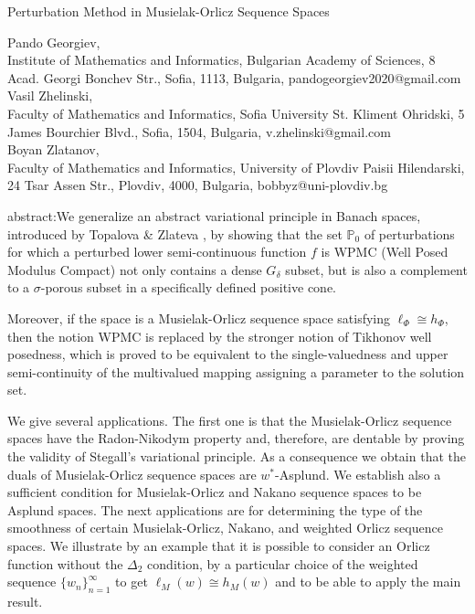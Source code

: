 \documentclass[12pt]{article}
\theoremstyle{thmstyleone}%
\theoremstyle{thmstyletwo}%
\theoremstyle{thmstylethree}%
\begin{document}
\begin{center}
	{\Large Perturbation Method in Musielak-Orlicz Sequence Spaces}
\end{center}

\begin{center}
	{\sc Pando Georgiev},\\ 
	Institute of Mathematics and Informatics, Bulgarian Academy of Sciences, 
	8 Acad. Georgi Bonchev Str., Sofia, 1113, Bulgaria, pandogeorgiev2020@gmail.com\\
	{\sc Vasil Zhelinski},\\
	Faculty of Mathematics and Informatics, Sofia University St. Kliment Ohridski, 5 James Bourchier Blvd., Sofia, 1504, Bulgaria, v.zhelinski@gmail.com\\
	{\sc Boyan Zlatanov}, \\
	Faculty of Mathematics and Informatics, University of Plovdiv Paisii Hilendarski, 24 Tsar Assen Str., Plovdiv, 4000, Bulgaria, bobbyz@uni-plovdiv.bg
\end{center}


{\sc abstract:}We generalize an abstract variational principle in Banach spaces, introduced by Topalova \& Zlateva \cite{Topalova-Zlateva},
	by showing that the set $\mathbb{P}_0$ of perturbations for which a perturbed lower semi-continuous function $f$ is WPMC (Well Posed Modulus Compact) not only contains a dense $G_\delta$ subset, but is also a complement to a $\sigma$-porous subset in a specifically defined positive cone. 
	
	Moreover, if the space is a Musielak-Orlicz sequence space satisfying $\ell_\Phi\cong h_{\Phi}$, then the notion WPMC is replaced by the stronger notion of  Tikhonov well posedness, which is proved to be equivalent to the single-valuedness and upper semi-continuity of the multivalued mapping assigning a parameter to the solution set. 
	
	We give several applications. The first one is 
	that the Musielak-Orlicz sequence spaces have the Radon-Nikodym property and, therefore, are dentable by proving the validity of  Stegall's variational principle. As a consequence we obtain that the duals of Musielak-Orlicz sequence spaces are $w^*$-Asplund. We establish also a sufficient condition for Musielak-Orlicz and Nakano sequence spaces to be  Asplund spaces. 
	The next applications are for  determining the type of the smoothness of certain Musielak-Orlicz, Nakano, and weighted Orlicz sequence spaces. We illustrate by an example
	that it is possible to consider an Orlicz function without the $\Delta_2$ condition,   by a particular choice of the weighted sequence $\{w_n\}_{n=1}^\infty$ to get $\ell_M(w)\cong h_M(w)$ and to be able to apply the main result.
\end{document}
